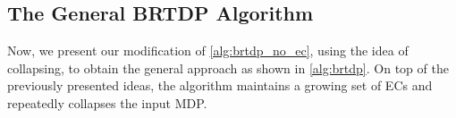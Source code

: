 \documentclass{article}
\newcommand{\intersectionSym}{\cap}
\newcommand{\intersectionBin}{\mathbin{\intersectionSym}}
\newcommand{\intersection}{\intersectionBin}
\newcommand{\MDP}{\mathcal{M}}
\newcommand{\initialstate}{\hat{s}}
\DeclareMathOperator{\val}{\mathcal{V}}
\newcommand{\upperbound}{\mathsf{Up}}
\newcommand{\lowerbound}{\mathsf{Lo}}
\newcommand{\targetstate}{s_+}
\newcommand{\sinkstate}{s_-}
\newcommand{\targetset}{T}
\DeclareMathOperator{\collapse}{collapse}
\newcommand{\ecremain}{\mathrm{rem}}
\newcommand{\algoepisode}{\mathsf{e}}
\begin{document}
\subsection{The General BRTDP Algorithm}

Now, we present our modification of \cref{alg:brtdp_no_ec}, using the idea of collapsing, to obtain the general approach as shown in \cref{alg:brtdp}.
On top of the previously presented ideas, the algorithm maintains a growing set of ECs and repeatedly collapses the input MDP.

		
\end{document}
